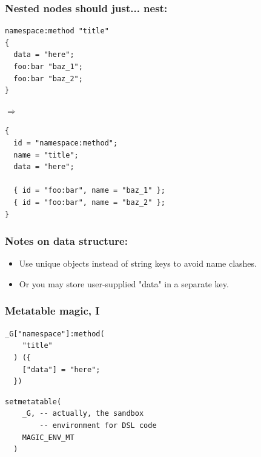 \documentclass[handout]{beamer}
\begin{document}
\begin{frame}[fragile]

\frametitle{Nested nodes should just... nest:}

\begin{verbatim}
namespace:method "title"
{
  data = "here";
  foo:bar "baz_1";
  foo:bar "baz_2";
}
\end{verbatim}

$\Rightarrow$

\begin{verbatim}
{
  id = "namespace:method";
  name = "title";
  data = "here";

  { id = "foo:bar", name = "baz_1" };
  { id = "foo:bar", name = "baz_2" };
}
\end{verbatim}

\end{frame}


\begin{frame}[fragile]

\frametitle{Notes on data structure:}

\begin{itemize}
\item Use unique objects instead of string keys to avoid name clashes.
\item Or you may store user-supplied "data" in a separate key.
\end{itemize}

\end{frame}


\begin{frame}[fragile]

\frametitle{Metatable magic, I}

\begin{verbatim}
_G["namespace"]:method(
    "title"
  ) ({
    ["data"] = "here";
  })
\end{verbatim}

\pause

\begin{verbatim}
setmetatable(
    _G, -- actually, the sandbox
        -- environment for DSL code
    MAGIC_ENV_MT
  )
\end{verbatim}

\end{frame}
\end{document}
